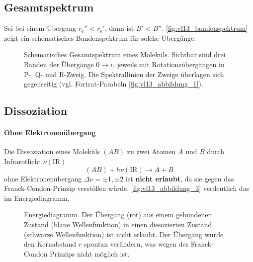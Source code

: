 \subsection{Gesamtspektrum}
Sei bei einem Übergang $r_{\mathrm{e}}'' < r_{\mathrm{e}}'$, dann ist $B' < B''$. \autoref{fig:vl13_bandenspektrum} zeigt ein schematisches Bandenspektrum für solche Übergänge.
	\begin{figure}[H]
		\centering
		\caption{
			Schematisches Gesamtspektrum eines Moleküls. Sichtbar sind drei Banden der Übergänge $0\to i$, jeweils mit Rotationsübergängen in P-, Q- und R-Zweig. 
			Die Spektrallinien der Zweige überlagen sich gegenseitig (vgl. Fortrat-Parabeln \autoref{fig:vl13_abbildung_1}).
		}
		\label{fig:vl13_bandenspektrum}
	\end{figure}

\subsection{Dissoziation}
\paragraph{Ohne Elektronenübergang}
	Die Dissoziation eines Moleküls $(AB)$ zu zwei Atomen $A$ und $B$ durch Infrarotlicht $\nu(\mathrm{IR})$
	$$
	(AB) + h \nu(\text{IR}) \to  A+B
	$$ 
	ohne Elektronenübergang $\Delta \nu = \pm 1, \pm 2$ ist \textbf{nicht erlaubt}, da sie gegen das Franck-Condon-Prinzip verstößen würde.
	\autoref{fig:vl13_abbildung_3} verdeutlich das im Energiediagramm.
	\begin{figure}[H]
		\centering
		\caption{Energiediagramm. 
			Der Übergang (rot) aus einem gebundenen Zustand (blaue Wellenfunktion) in einen dissozierten Zustand (schwarze Wellenfunktion) ist nicht erlaubt.
			Der Übergang würde den Kernabstand $r$ spontan verändern, was wegen des Franck-Condon Prinzips nicht möglich ist. 
		}
		\label{fig:vl13_abbildung_3}
	\end{figure}

